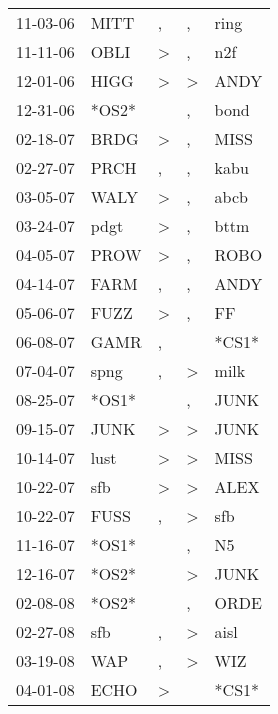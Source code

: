 \begin{supertabular}{lllll}
 11-03-06 &   MITT &                , &                , &   ring \\
 11-11-06 &   OBLI &     \textgreater &                , &    n2f \\
 12-01-06 &   HIGG &     \textgreater &     \textgreater &   ANDY \\
 12-31-06 &  *OS2* &                  &                , &   bond \\
 02-18-07 &   BRDG &     \textgreater &                , &   MISS \\
 02-27-07 &   PRCH &                , &                , &   kabu \\
 03-05-07 &   WALY &     \textgreater &                , &   abcb \\
 03-24-07 &   pdgt &     \textgreater &                , &   bttm \\
 04-05-07 &   PROW &     \textgreater &                , &   ROBO \\
 04-14-07 &   FARM &                , &                , &   ANDY \\
 05-06-07 &   FUZZ &     \textgreater &                , &     FF \\
 06-08-07 &   GAMR &                , &                  &  *CS1* \\
 07-04-07 &   spng &                , &     \textgreater &   milk \\
 08-25-07 &  *OS1* &                  &                , &   JUNK \\
 09-15-07 &   JUNK &     \textgreater &     \textgreater &   JUNK \\
 10-14-07 &   lust &     \textgreater &     \textgreater &   MISS \\
 10-22-07 &    sfb &     \textgreater &     \textgreater &   ALEX \\
 10-22-07 &   FUSS &                , &     \textgreater &    sfb \\
 11-16-07 &  *OS1* &                  &                , &     N5 \\
 12-16-07 &  *OS2* &                  &     \textgreater &   JUNK \\
 02-08-08 &  *OS2* &                  &                , &   ORDE \\
 02-27-08 &    sfb &                , &     \textgreater &   aisl \\
 03-19-08 &    WAP &                , &     \textgreater &    WIZ \\
 04-01-08 &   ECHO &     \textgreater &                  &  *CS1* \\

\end{supertabular}
